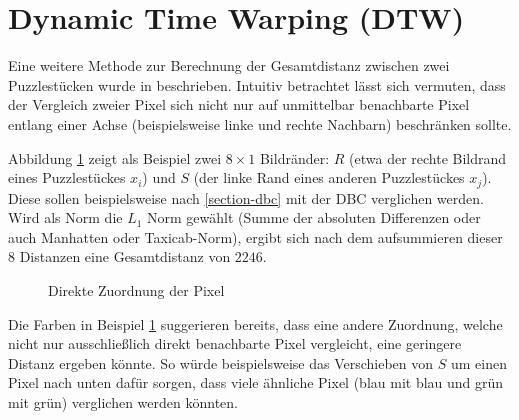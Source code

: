 \documentclass{whswinvcbook}
\begin{document}
\section{Dynamic Time Warping (DTW)}\label{section-dtw}
Eine weitere Methode zur Berechnung der Gesamtdistanz zwischen zwei Puzzlestücken wurde in \cite{hungarian} beschrieben. Intuitiv betrachtet lässt sich vermuten, dass der Vergleich zweier Pixel sich nicht nur auf unmittelbar benachbarte Pixel entlang einer Achse (beispielsweise linke und rechte Nachbarn) beschränken sollte.

Abbildung \ref{fig-dtw-ex} zeigt als Beispiel zwei $8\times1$ Bildränder: $R$ (etwa der rechte Bildrand eines Puzzlestückes $x_i$) und $S$ (der linke Rand eines anderen Puzzlestückes $x_j$). Diese sollen beispielsweise nach \ref{section-dbc} mit der DBC verglichen werden. Wird als Norm die $L_1$ Norm gewählt (Summe der absoluten Differenzen oder auch Manhatten oder Taxicab-Norm), ergibt sich nach dem aufsummieren dieser $8$ Distanzen eine Gesamtdistanz von $2246$.
\begin{figure}[H]
    \centering
    \quad\quad\quad\quad
    \caption{Direkte Zuordnung der Pixel}
    \label{fig-dtw-ex}
\end{figure}
Die Farben in Beispiel \ref{fig-dtw-ex} suggerieren bereits, dass eine andere Zuordnung, welche nicht nur ausschließlich direkt benachbarte Pixel vergleicht, eine geringere Distanz ergeben könnte. So würde beispielsweise das Verschieben von $S$ um einen Pixel nach unten dafür sorgen, dass viele ähnliche Pixel (blau mit blau und grün mit grün) verglichen werden könnten.
\end{document}
